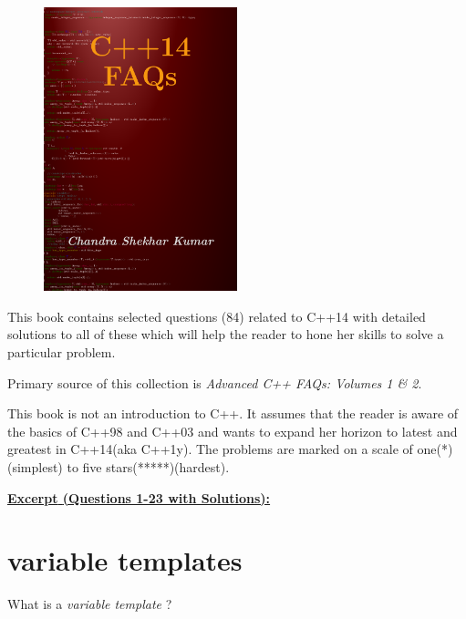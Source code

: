 
\begin{figure}
  \begin{center}
    \includegraphics[width=0.5\textwidth]{cpp14faqs/cover}
  \end{center}
\end{figure}

This book contains selected questions (84) related to C++14 with detailed solutions to all of these which will help the reader to hone her skills to solve a particular problem.

Primary source of this collection is \emph{Advanced C++ FAQs: Volumes 1 \& 2}.

This book is not an introduction to C++. It assumes that the reader is aware of the basics of C++98 and C++03 and wants to expand her horizon to latest and greatest in C++14(aka C++1y). The problems are marked on a scale of one(*)(simplest) to five stars(*****)(hardest).

\hrulefill

\underline{\textbf{\textcolor{BurntOrange}{Excerpt} \textcolor{Sepia}{(Questions 1-23 with Solutions):}}}

\section{variable templates}


\begin{Exercise}[title={variable template}, difficulty=3, label=ex01]
What is a \emph{variable template} ?
\end{Exercise}



